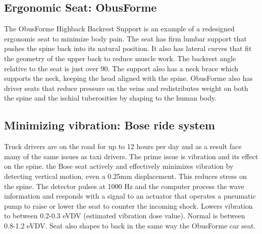 \documentclass[11pt]{article}
\begin{document}
\subsection{Ergonomic Seat: ObusForme}
The ObusForme Highback Backrest Support is an example of a redesigned ergonomic seat to minimize body pain. 
The seat has firm lumbar support that pushes the spine back into its natural position. 
It also has lateral curves that fit the geometry of the upper back to reduce muscle work\cite{ObusFormebackrest}. 
The backrest angle relative to the seat is just over 90\textdegree. The support also has a neck brace which supports
the neck, keeping the head aligned with the spine\cite{ObusFormedriverchair}.
ObusForme also has driver seats that reduce pressure on the veins and redistributes weight 
on both the spine and the ischial tuberosities by shaping to the human body\cite{ObusFormecushion}.

\subsection{Minimizing vibration: Bose ride system}
Truck drivers are on the road for up to 12 hours per day and as a result face many of the same issues as taxi drivers. 
The prime issue is vibration and its effect on the spine. the Bose seat actively and effectively minimizes vibration 
by detecting vertical motion, even a 0.25mm displacement. This reduces stress on the spine. 
The detector pulses at 1000 Hz and the computer process the 
wave information and responds with a signal to an actuator that operates a pneumatic pump to raise or lower the seat to 
counter the incoming shock. Lowers vibration to between 0.2-0.3 eVDV (estimated vibration dose value). Normal is 
between 0.8-1.2 eVDV\cite{Bosetruckseat}. Seat also shapes to back in the same way the 
ObusForme car seat\cite{Bosetruckseat}.
\end{document}
